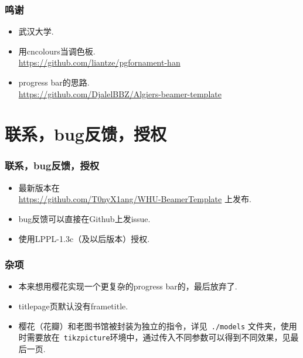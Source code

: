 \documentclass{beamer}
\begin{document}
\begin{frame}
    \frametitle{鸣谢}
    \begin{itemize}
        \item 武汉大学.
        \item 用cncolours当调色板. \\ \url{https://github.com/liantze/pgfornament-han}
        \item progress bar的思路. \\ \url{https://github.com/DjalelBBZ/Algiers-beamer-template} 
    \end{itemize}
\end{frame}

\section{联系，bug反馈，授权}
\begin{frame}
    \frametitle{联系，bug反馈，授权}
    \begin{itemize}
        \item 最新版本在 \\ \url{https://github.com/T0nyX1ang/WHU-BeamerTemplate} 上发布.
        \item bug反馈可以直接在Github上发issue.
        \item 使用LPPL-1.3c（及以后版本）授权.
    \end{itemize}
\end{frame}

\begin{frame}[fragile]
    \frametitle{杂项}
    \begin{itemize}
        \item 本来想用樱花实现一个更复杂的progress bar的，最后放弃了.
        \item titlepage页\alert{默认没有}frametitle.
        \item 樱花（花瓣）和老图书馆被封装为独立的指令，详见~\verb|./models| 文件夹，使用时需要放在~\verb|tikzpicture|环境中，通过传入不同参数可以得到不同效果，见最后一页. \hyperlink{final}{}
    \end{itemize}
\end{frame}

\begingroup
{}
\begin{frame}[label=final]
\begin{figure}
    \centering
\end{figure}

\end{frame}
\endgroup
\end{document}
